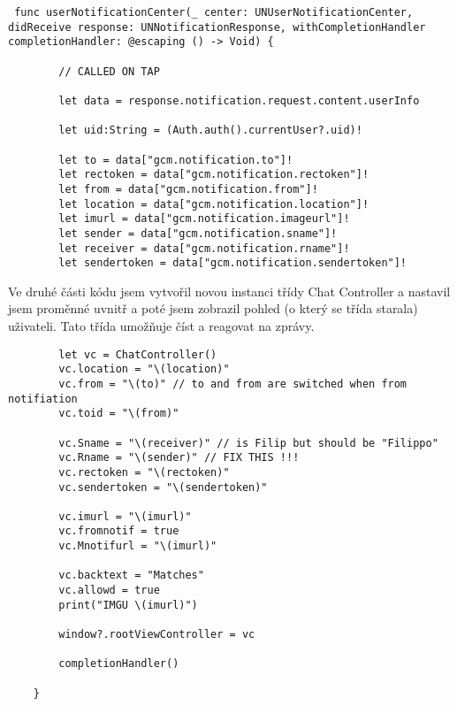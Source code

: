 \documentclass{article}
\begin{document}
\vspace{10 mm}
\begin{verbatim}
 func userNotificationCenter(_ center: UNUserNotificationCenter, didReceive response: UNNotificationResponse, withCompletionHandler completionHandler: @escaping () -> Void) {
        
        // CALLED ON TAP
       
        let data = response.notification.request.content.userInfo
        
        let uid:String = (Auth.auth().currentUser?.uid)!
        
        let to = data["gcm.notification.to"]!
        let rectoken = data["gcm.notification.rectoken"]!
        let from = data["gcm.notification.from"]!
        let location = data["gcm.notification.location"]!
        let imurl = data["gcm.notification.imageurl"]!
        let sender = data["gcm.notification.sname"]!
        let receiver = data["gcm.notification.rname"]!
        let sendertoken = data["gcm.notification.sendertoken"]!
        \end{verbatim}
        
        
        
    \vspace{10 mm}    
Ve druhé části kódu jsem vytvořil novou instanci třídy Chat Controller a nastavil jsem proměnné uvnitř a poté jsem zobrazil pohled (o který se třída starala) uživateli. Tato třída umožňuje číst a reagovat na zprávy.



\vspace{10 mm}
        \begin{verbatim}
        let vc = ChatController()
        vc.location = "\(location)"
        vc.from = "\(to)" // to and from are switched when from notifiation
        vc.toid = "\(from)"
        
        vc.Sname = "\(receiver)" // is Filip but should be "Filippo"
        vc.Rname = "\(sender)" // FIX THIS !!!
        vc.rectoken = "\(rectoken)"
        vc.sendertoken = "\(sendertoken)"
        
        vc.imurl = "\(imurl)"
        vc.fromnotif = true
        vc.Mnotifurl = "\(imurl)"
        
        vc.backtext = "Matches"
        vc.allowd = true
        print("IMGU \(imurl)")
        
        window?.rootViewController = vc
        
        completionHandler()
        
    }


       \end{verbatim}
\end{document}
